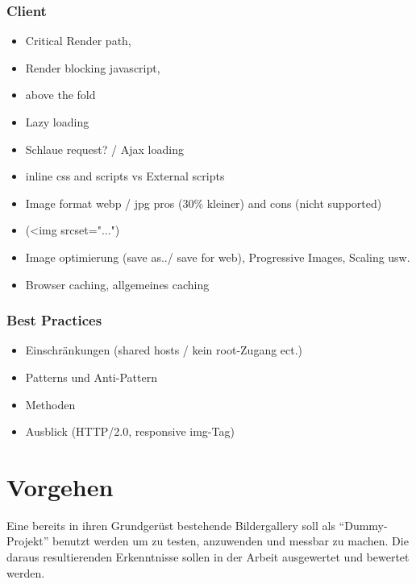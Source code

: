 \documentclass[a4paper,11pt,singlespacing]{article}
\begin{document}
		\subsubsection{Client} %
		\label{ssub:client}
		\begin{itemize}
			\item Critical Render path, 
			\item Render blocking javascript, 
			\item above the fold
			\item Lazy loading
			\item Schlaue request? / Ajax loading
			\item inline css and scripts vs External scripts
			\item Image format webp / jpg pros (30\% kleiner) and cons (nicht supported)
			\item (<img srcset="...")
			\item Image optimierung (save as../ save for web), Progressive Images, Scaling usw.
			\item Browser caching, allgemeines caching
		\end{itemize}

		\subsubsection{Best Practices} %
		\label{ssub:best_practices}
			\begin{itemize}
				\item Einschränkungen (shared hosts / kein root-Zugang ect.)
				\item Patterns und Anti-Pattern
				\item Methoden
				\item Ausblick (HTTP/2.0, responsive img-Tag)
			\end{itemize}

\section{Vorgehen} %
\label{sec:vorgehen}
	Eine bereits in ihren Grundgerüst bestehende Bildergallery soll als "`Dummy-Projekt"' benutzt werden um zu testen, anzuwenden und messbar zu machen. Die daraus resultierenden Erkenntnisse sollen in der Arbeit ausgewertet und bewertet werden. 
\end{document}
